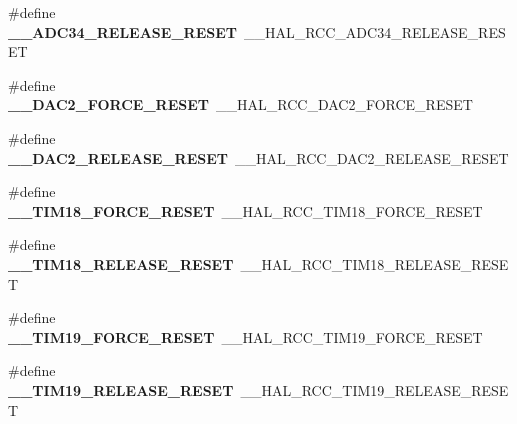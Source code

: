 \begin{DoxyCompactItemize}
\item 
\#define {\bfseries \+\_\+\+\_\+\+A\+D\+C34\+\_\+\+R\+E\+L\+E\+A\+S\+E\+\_\+\+R\+E\+S\+ET}~\+\_\+\+\_\+\+H\+A\+L\+\_\+\+R\+C\+C\+\_\+\+A\+D\+C34\+\_\+\+R\+E\+L\+E\+A\+S\+E\+\_\+\+R\+E\+S\+ET\hypertarget{group___h_a_l___r_c_c___aliased_gad758bcf779fd9cab005fcc8fc6bf23ae}{}\label{group___h_a_l___r_c_c___aliased_gad758bcf779fd9cab005fcc8fc6bf23ae}

\item 
\#define {\bfseries \+\_\+\+\_\+\+D\+A\+C2\+\_\+\+F\+O\+R\+C\+E\+\_\+\+R\+E\+S\+ET}~\+\_\+\+\_\+\+H\+A\+L\+\_\+\+R\+C\+C\+\_\+\+D\+A\+C2\+\_\+\+F\+O\+R\+C\+E\+\_\+\+R\+E\+S\+ET\hypertarget{group___h_a_l___r_c_c___aliased_gaf8cc5ae83a56884ca8e347a876f425b3}{}\label{group___h_a_l___r_c_c___aliased_gaf8cc5ae83a56884ca8e347a876f425b3}

\item 
\#define {\bfseries \+\_\+\+\_\+\+D\+A\+C2\+\_\+\+R\+E\+L\+E\+A\+S\+E\+\_\+\+R\+E\+S\+ET}~\+\_\+\+\_\+\+H\+A\+L\+\_\+\+R\+C\+C\+\_\+\+D\+A\+C2\+\_\+\+R\+E\+L\+E\+A\+S\+E\+\_\+\+R\+E\+S\+ET\hypertarget{group___h_a_l___r_c_c___aliased_ga2ca6c2de66e0242e9941d090e8e99ecd}{}\label{group___h_a_l___r_c_c___aliased_ga2ca6c2de66e0242e9941d090e8e99ecd}

\item 
\#define {\bfseries \+\_\+\+\_\+\+T\+I\+M18\+\_\+\+F\+O\+R\+C\+E\+\_\+\+R\+E\+S\+ET}~\+\_\+\+\_\+\+H\+A\+L\+\_\+\+R\+C\+C\+\_\+\+T\+I\+M18\+\_\+\+F\+O\+R\+C\+E\+\_\+\+R\+E\+S\+ET\hypertarget{group___h_a_l___r_c_c___aliased_ga6b03e584a99a7145ffd9953327722870}{}\label{group___h_a_l___r_c_c___aliased_ga6b03e584a99a7145ffd9953327722870}

\item 
\#define {\bfseries \+\_\+\+\_\+\+T\+I\+M18\+\_\+\+R\+E\+L\+E\+A\+S\+E\+\_\+\+R\+E\+S\+ET}~\+\_\+\+\_\+\+H\+A\+L\+\_\+\+R\+C\+C\+\_\+\+T\+I\+M18\+\_\+\+R\+E\+L\+E\+A\+S\+E\+\_\+\+R\+E\+S\+ET\hypertarget{group___h_a_l___r_c_c___aliased_ga062debe81b59ed9a88bcf4258e09dbaf}{}\label{group___h_a_l___r_c_c___aliased_ga062debe81b59ed9a88bcf4258e09dbaf}

\item 
\#define {\bfseries \+\_\+\+\_\+\+T\+I\+M19\+\_\+\+F\+O\+R\+C\+E\+\_\+\+R\+E\+S\+ET}~\+\_\+\+\_\+\+H\+A\+L\+\_\+\+R\+C\+C\+\_\+\+T\+I\+M19\+\_\+\+F\+O\+R\+C\+E\+\_\+\+R\+E\+S\+ET\hypertarget{group___h_a_l___r_c_c___aliased_ga9e4eca7dac56bd682758cf5072f4e063}{}\label{group___h_a_l___r_c_c___aliased_ga9e4eca7dac56bd682758cf5072f4e063}

\item 
\#define {\bfseries \+\_\+\+\_\+\+T\+I\+M19\+\_\+\+R\+E\+L\+E\+A\+S\+E\+\_\+\+R\+E\+S\+ET}~\+\_\+\+\_\+\+H\+A\+L\+\_\+\+R\+C\+C\+\_\+\+T\+I\+M19\+\_\+\+R\+E\+L\+E\+A\+S\+E\+\_\+\+R\+E\+S\+ET\hypertarget{group___h_a_l___r_c_c___aliased_ga16341f8a1420c4029215b0c89de8bda5}{}\label{group___h_a_l___r_c_c___aliased_ga16341f8a1420c4029215b0c89de8bda5}


\end{DoxyCompactItemize}
